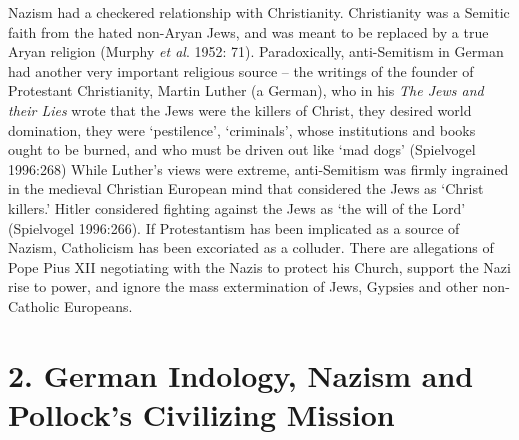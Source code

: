 Nazism had a checkered relationship with Christianity. Christianity was a Semitic faith from the hated non-Aryan Jews, and was meant to be replaced by a true Aryan religion (Murphy \textit{et al}. 1952: 71). Paradoxically, anti-Semitism in German had another very important religious source – the writings of the founder of Protestant Christianity, Martin Luther (a German), who in his \textit{The Jews and their Lies} wrote that the Jews were the killers of Christ, they desired world domination, they were ‘pestilence’, ‘criminals’, whose institutions and books ought to be burned, and who must be driven out like ‘mad dogs’ (Spielvogel 1996:268) While Luther’s views were extreme, anti-Semitism was firmly ingrained in the medieval Christian European mind that considered the Jews as ‘Christ killers.’ Hitler considered fighting against the Jews as ‘the will of the Lord’ (Spielvogel 1996:266). If Protestantism has been implicated as a source of Nazism, Catholicism has been excoriated as a colluder. There are allegations of Pope Pius XII negotiating with the Nazis to protect his Church, support the Nazi rise to power, and ignore the mass extermination of Jews, Gypsies and other non-Catholic Europeans.

\vspace{-.3cm}

\section*{2. German Indology, Nazism \hfill\break and Pollock’s Civilizing Mission}

